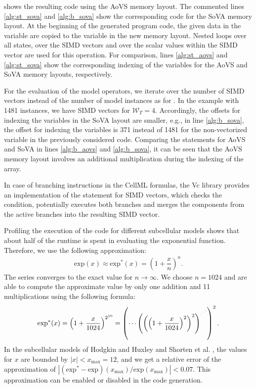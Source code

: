  shows the resulting code using the AoVS memory layout. The commented lines \ref{alg:st_sova} and \ref{alg:b_sova} show the corresponding code for the SoVA memory layout.
At the beginning of the generated program code, the given data in the  variable are copied to the  variable in the new memory layout. Nested loops over all states, over the SIMD vectors and over the scalar values within the SIMD vector are used for this operation. For comparison, lines \ref{alg:st_aovs} and \ref{alg:st_sova} show the corresponding indexing of the  variables for the AoVS and SoVA memory layouts, respectively.

For the evaluation of the model operators, we iterate over the number  of SIMD vectors instead of the number of model instances as for . In the example with 1481 instances, we have  SIMD vectors for $\mathcal{W}_T=4$. 
Accordingly, the offsets for indexing the variables in the SoVA layout are smaller, e.g., in line \ref{alg:b_sova}, the offset for indexing the  variables is 371 instead of 1481 for the non-vectorized variable in the previously considered  code. 
Comparing the statements for AoVS and SoVA in lines \ref{alg:b_aovs} and \ref{alg:b_sova}, it can be seen that the AoVS memory layout involves an additional multiplication during the indexing of the array.

In case of branching instructions in the CellML formulas, the Vc library provides an implementation of the  statement for SIMD vectors, which checks the condition, potentially executes both branches and merges the components from the active branches into the resulting SIMD vector.

Profiling the execution of the  code for different subcellular models shows that about half of the runtime is spent in evaluating the exponential function. Therefore, we use the following approximation:
\begin{align}\label{eq:apx-e-function}
  \textrm{exp}(x) \approx \textrm{exp}^\ast(x) = \left( 1 + \dfrac{x}{n}\right)^n.
\end{align}
The series converges to the exact value for $n\to \infty$. We choose $n=1024$ and are able to compute the approximate value by only one addition and 11 multiplications using the following formula:
\begin{align*}
    \textrm{exp}^\ast(x) = \left( 1 + \dfrac{x}{1024}\right)^{2^{10}} = \left(\cdots{{\left({\left(\left( 1 + \dfrac{x}{1024}\right)^2\right)}^2\right)}^{\scriptsize\iddots}}\right)^2.
\end{align*}
%
In the subcellular models of Hodgkin and Huxley \cite{Hodgkin1952} and Shorten et al. \cite{Shorten2007}, the values for $x$ are bounded by $|x| < x_\text{max} = 12$, and we get a relative error of the approximation of $|(\textrm{exp}^\ast - \textrm{exp})(x_\text{max}) / \textrm{exp}(x_\text{max})| < 0.07.$
This approximation can be enabled or disabled in the code generation.

